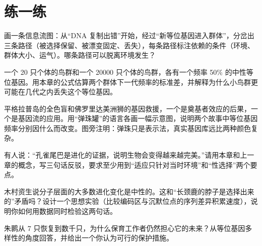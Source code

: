 \section*{练一练}

\begin{sikaoti}
\item 画一条信息流图：从“DNA 复制出错”开始，经过“新等位基因进入群体”，分岔出三条路径（被选择保留、被漂变固定、丢失），每条路径标注依赖的条件（环境、群体大小、运气）。哪条路径可以脱离环境发生？
\item 一个 20 只个体的鸟群和一个 20000 只个体的鸟群，各有一个频率 50\% 的中性等位基因。用本章的公式估算两个群体下一代频率的标准差，并解释为什么小鸟群更可能在几代之内丢失这个等位基因。
\item 平格拉普岛的全色盲和佛罗里达美洲狮的基因救援，一个是奠基者效应的后果，一个是基因流的应用。用“弹珠罐”的语言各画一幅示意图，说明两个故事中等位基因频率分别因什么而改变。图旁注明：弹珠只是表示法，真实基因库远比两种颜色复杂。
\item 有人说：“孔雀尾巴是进化的证据，说明生物会变得越来越完美。”请用本章和上一章的概念，写三句话反驳，要求至少用到“适应只针对当时环境”和“性选择”两个要点。
\item 木村资生说分子层面的大多数进化变化是中性的。这和“长颈鹿的脖子是选择出来的”矛盾吗？设计一个思想实验（比较编码区与沉默位点的序列差异积累速度），说明你如何用数据同时检验这两句话。
\item 朱鹮从 7 只恢复到数千只，为什么保育工作者仍然担心它的未来？从等位基因多样性的角度回答，并给出一个你认为可行的保护措施。
\end{sikaoti}
